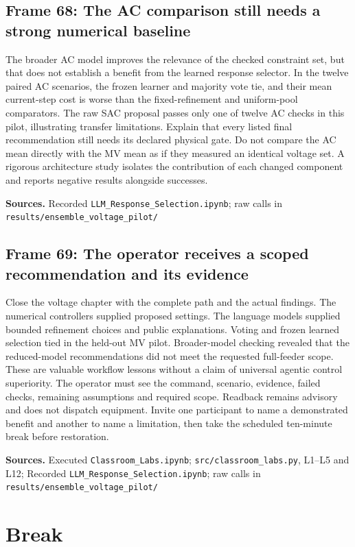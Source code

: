 \documentclass[11pt]{article}
\begin{document}
\subsection*{Frame 68: The AC comparison still needs a strong numerical baseline}
The broader AC model improves the relevance of the checked constraint set, but that does not establish a benefit from the learned response selector. In the twelve paired AC scenarios, the frozen learner and majority vote tie, and their mean current-step cost is worse than the fixed-refinement and uniform-pool comparators. The raw SAC proposal passes only one of twelve AC checks in this pilot, illustrating transfer limitations. Explain that every listed final recommendation still needs its declared physical gate. Do not compare the AC mean directly with the MV mean as if they measured an identical voltage set. A rigorous architecture study isolates the contribution of each changed component and reports negative results alongside successes.\par
\par\nopagebreak\begin{minipage}{\linewidth}{\footnotesize\color{slate}\textbf{Sources.} Recorded \texttt{LLM\_Response\_Selection.ipynb}; raw calls in \texttt{results/ensemble\_voltage\_pilot/}\par}\end{minipage}\par\medskip
\subsection*{Frame 69: The operator receives a scoped recommendation and its evidence}
Close the voltage chapter with the complete path and the actual findings. The numerical controllers supplied proposed settings. The language models supplied bounded refinement choices and public explanations. Voting and frozen learned selection tied in the held-out MV pilot. Broader-model checking revealed that the reduced-model recommendations did not meet the requested full-feeder scope. These are valuable workflow lessons without a claim of universal agentic control superiority. The operator must see the command, scenario, evidence, failed checks, remaining assumptions and required scope. Readback remains advisory and does not dispatch equipment. Invite one participant to name a demonstrated benefit and another to name a limitation, then take the scheduled ten-minute break before restoration.\par
\par\nopagebreak\begin{minipage}{\linewidth}{\footnotesize\color{slate}\textbf{Sources.} Executed \texttt{Classroom\_Labs.ipynb}; \texttt{src/classroom\_labs.py}, L1--L5 and L12; Recorded \texttt{LLM\_Response\_Selection.ipynb}; raw calls in \texttt{results/ensemble\_voltage\_pilot/}\par}\end{minipage}\par\medskip
\clearpage\section{Break}
\end{document}

